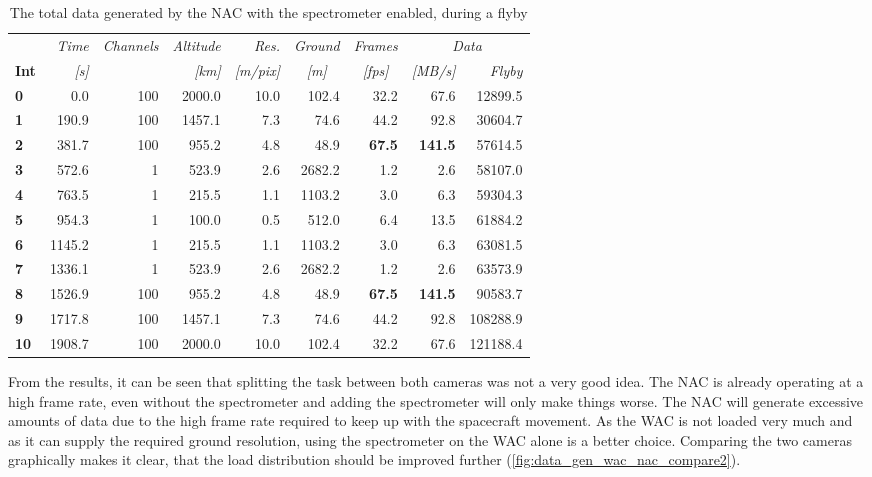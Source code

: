 \begin{table}[h!]
  \centering
    \begin{tabular}{l|r|r|r|r|r|r|r|r|}
      & \textit{Time} & \textit{Channels} & \textit{Altitude} & \textit{Res.} & \textit{Ground} & \textit{Frames } & \multicolumn{2}{c}{\textit{Data}} \\
\textbf{Int} & \textit{[s]} & \textit{} & \textit{[km]} & \textit{[m/pix]} & \multicolumn{1}{c|}{\textit{[m]}} & \multicolumn{1}{c|}{\textit{[fps]}} & \textit{[MB/s]} & \multicolumn{1}{r}{\textit{Flyby}} \bigstrut[b]\\
\hline
\textbf{0} & 0.0   & 100   & 2000.0 & 10.0  & 102.4 & 32.2  & 67.6  & 12899.5 \bigstrut[t]\\
\textbf{1} & 190.9 & 100   & 1457.1 & 7.3   & 74.6  & 44.2  & 92.8  & 30604.7 \\
\textbf{2} & 381.7 & 100   & 955.2 & 4.8   & 48.9  & \textbf{67.5} & \textbf{141.5} & 57614.5 \\
\textbf{3} & 572.6 & 1     & 523.9 & 2.6   & 2682.2 & 1.2   & 2.6   & 58107.0 \\
\textbf{4} & 763.5 & 1     & 215.5 & 1.1   & 1103.2 & 3.0   & 6.3   & 59304.3 \\
\textbf{5} & 954.3 & 1     & 100.0 & 0.5   & 512.0 & 6.4   & 13.5  & 61884.2 \\
\textbf{6} & 1145.2 & 1     & 215.5 & 1.1   & 1103.2 & 3.0   & 6.3   & 63081.5 \\
\textbf{7} & 1336.1 & 1     & 523.9 & 2.6   & 2682.2 & 1.2   & 2.6   & 63573.9 \\
\textbf{8} & 1526.9 & 100   & 955.2 & 4.8   & 48.9  & \textbf{67.5} & \textbf{141.5} & 90583.7 \\
\textbf{9} & 1717.8 & 100   & 1457.1 & 7.3   & 74.6  & 44.2  & 92.8  & 108288.9 \\
\textbf{10} & 1908.7 & 100   & 2000.0 & 10.0  & 102.4 & 32.2  & 67.6  & 121188.4 \\
\end{tabular}%
    \caption{The total data generated by the NAC with the spectrometer enabled, during a flyby}
  \label{tab:nac_flyby_data_spectrometer}%
\end{table}%
From the results, it can be seen that splitting the task between both cameras was not a very good idea. The NAC is already operating at a high frame rate, even without the spectrometer and adding the spectrometer will only make things worse. The NAC will generate excessive amounts of data due to the high frame rate required to keep up with the spacecraft movement. As the WAC is not loaded very much and as it can supply the required ground resolution, using the spectrometer on the WAC alone is a better choice. Comparing the two cameras graphically makes it clear, that the load distribution should be improved further (\ref{fig:data_gen_wac_nac_compare2}).
